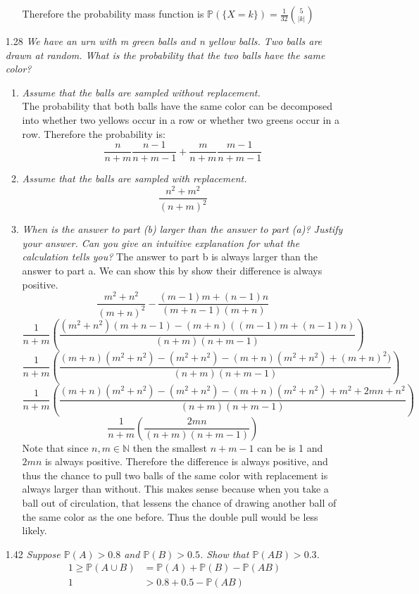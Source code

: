 \documentclass[12pt, letterpaper]{article}
\newcommand{\N}{\mathbb{N}}
\newcommand{\Pro}{\mathbb{P}}
\begin{document}
\begin{enumerate}
\begin{itemize}
		Therefore the probability mass function is 
		$\Pro(\{X = k\}) = \frac{1}{32} \binom{5}{|k|}$
	\end{itemize}
	\item[1.28] \textit{We have an urn with m green balls and n yellow balls. Two balls
are drawn at random. What is the probability that the two balls have the same
color?}
	\begin{enumerate}
		\item \textit{Assume that the balls are sampled without replacement.}\\
		The probability that both balls have the same color can be decomposed into whether two yellows occur in a row or whether two greens occur in a row.
		Therefore the probability is:
		$$
			\frac{n}{n+m}\frac{n-1}{n+m-1} + \frac{m}{n+m}\frac{m-1}{n+m-1}
		$$
		\item \textit{Assume that the balls are sampled with replacement.}
		$$
			\frac{n^2 + m^2}{(n+m)^2}
		$$
		\item \textit{When is the answer to part (b) larger than the answer to part (a)? Justify
your answer. Can you give an intuitive explanation for what the
calculation tells you?}
	The answer to part b is always larger than the answer to part a.  
	We can show this by show their difference is always positive.
	$$
	\frac{m^2+n^2}{(m+n)^2}-\frac{(m-1) m+(n-1) n}{(m+n-1) (m+n)}$$
	$$
	\frac{1}{n+m}\left(\frac{(m^2 + n^2)(m+n-1) - (m+n)((m-1) m+(n-1) n)}{(n+m)(n+m-1)}\right)$$
	$$
	\frac{1}{n+m}\left(\frac{(m+n)(m^2+n^2)-(m^2+n^2)-(m+n)(m^2+n^2)+(m+n)^2)}{(n+m)(n+m-1)} \right)
	$$
	$$
		\frac{1}{n+m}\left(\frac{(m+n)(m^2+n^2)-(m^2+n^2)-(m+n)(m^2+n^2)+m^2+2mn+n^2}{(n+m)(n+m-1)}\right)
	$$
	$$
	\frac{1}{n+m}\left( \frac{2mn}{(n+m)(n+m-1)}\right)
	$$
	Note that since $n,m \in \N$ then the smallest $n+m-1$ can be is 1 and 
	$2mn$ is always positive.  Therefore the difference is always positive, and thus the chance to pull two balls of the same color with replacement is always larger than without.  This makes sense because when you take a ball out of circulation, that lessens the chance of drawing another ball of the same color as the one before.  Thus the double pull would be less likely.  
	\end{enumerate}
	\item[1.42] \textit{Suppose $\Pro(A) > 0.8$ and $\Pro(B) > 0.5$. Show that $\Pro(AB) > 0.3$.}
	\begin{align*}
		1 \geq \Pro(A\cup B) &= \Pro(A) + \Pro(B) - \Pro(AB)\\
		1 &> 0.8 + 0.5 - \Pro(AB)\\

\end{align*}
\end{enumerate}
\end{document}
